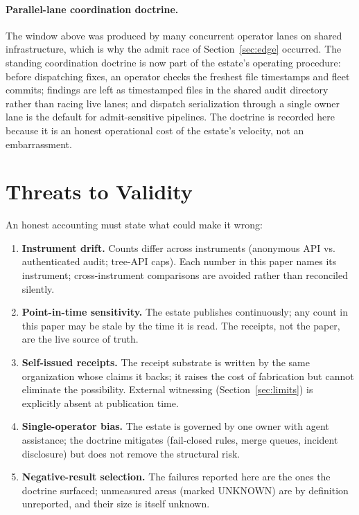 ﻿\documentclass[11pt]{article}
\begin{document}
\paragraph{Parallel-lane coordination doctrine.} The window above was produced by many concurrent operator lanes on shared infrastructure, which is why the admit race of Section~\ref{sec:edge} occurred. The standing coordination doctrine is now part of the estate's operating procedure: before dispatching fixes, an operator checks the freshest file timestamps and fleet commits; findings are left as timestamped files in the shared audit directory rather than racing live lanes; and dispatch serialization through a single owner lane is the default for admit-sensitive pipelines. The doctrine is recorded here because it is an honest operational cost of the estate's velocity, not an embarrassment.

\section{Threats to Validity}
\label{sec:threats}

An honest accounting must state what could make it wrong:
\begin{enumerate}
\item \textbf{Instrument drift.} Counts differ across instruments (anonymous API vs. authenticated audit; tree-API caps). Each number in this paper names its instrument; cross-instrument comparisons are avoided rather than reconciled silently.
\item \textbf{Point-in-time sensitivity.} The estate publishes continuously; any count in this paper may be stale by the time it is read. The receipts, not the paper, are the live source of truth.
\item \textbf{Self-issued receipts.} The receipt substrate is written by the same organization whose claims it backs; it raises the cost of fabrication but cannot eliminate the possibility. External witnessing (Section~\ref{sec:limits}) is explicitly absent at publication time.
\item \textbf{Single-operator bias.} The estate is governed by one owner with agent assistance; the doctrine mitigates (fail-closed rules, merge queues, incident disclosure) but does not remove the structural risk.
\item \textbf{Negative-result selection.} The failures reported here are the ones the doctrine surfaced; unmeasured areas (marked UNKNOWN) are by definition unreported, and their size is itself unknown.
\end{enumerate}
\end{document}
